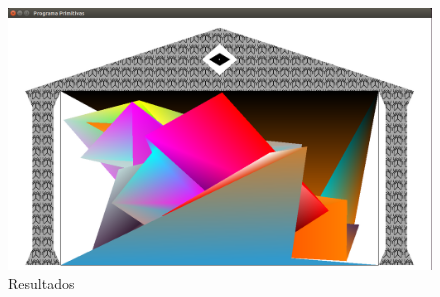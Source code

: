 \documentclass[a4paper,12pt]{article}
\begin{document}
\begin{enumerate}
\begin{figure}[H]
 \centering
 \includegraphics[scale = 0.35]{5.png}
 \caption{Resultados}
\end{figure}


\end{enumerate}
\end{document}
